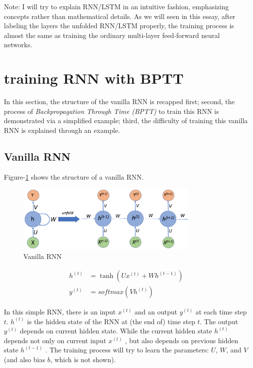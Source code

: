 \documentclass[english]{article}
\begin{document}
Note: I will try to explain RNN/LSTM in an intuitive fashion, emphasizing concepts rather than 
mathematical details. As we will seen in this essay, 
after labeling the layers the unfolded RNN/LSTM properly, the training process is almost the same as training the ordinary 
multi-layer feed-forward neural networks.


\section{training RNN with BPTT} \label{sec:rnn}
In this section, the structure of the vanilla RNN is recapped first; second, the process of 
\textit{Backpropagation Through Time (BPTT)}\cite{BPTT1995} to
train this RNN is demonstrated via a simplified example; third, the difficulty of training this vanilla RNN
is explained through an example.

\subsection{Vanilla RNN}
Figure-\ref{fig:vanillaRNN} shows the structure of a vanilla RNN.
\begin{figure}
	\centering
	\includegraphics[width=0.8\textwidth]{rnn}
	\caption{Vanilla RNN}
	\label{fig:vanillaRNN}
\end{figure}

\begin{align}
h^{(t)} &= \tanh(Ux^{(t)} + Wh^{(t-1)})\\
y^{(t)} &= softmax(Vh^{(t)})
\end{align}

In this simple RNN, there is an input $x^{(t)}$ and an output $y^{(t)}$ at each time step $t$. $h^{(t)}$ is the hidden state of the RNN at (the end of) time step $t$. The output  $y^{(t)}$ depends on current hidden state. While the current hidden state  $h^{(t)}$  depends not only on current input  $x^{(t)}$ ,
but also depends on previous hidden state  $h^{(t-1)}$ .
The training process will try to learn the parameters: $U$, $W$, and $V$ (and also bias $b$, which is not shown).
\end{document}
